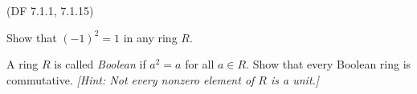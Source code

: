 \begin{problem}{(\textsf{DF 7.1.1, 7.1.15})}
  \begin{enumalph}
    \item Show that ${(-1)}^2=1$ in any ring $R$.
    \item A ring $R$ is called \emph{Boolean} if $a^2=a$ for all $a \in R$.  Show that 
    every Boolean ring is commutative.  \emph{[Hint: Not every nonzero element of $R$ 
    is a unit.]}
  \end{enumalph}
\end{problem}
